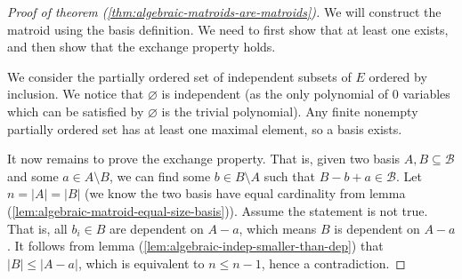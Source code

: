 \begin{proof}[Proof of theorem (\ref{thm:algebraic-matroids-are-matroids})]
    We will construct the matroid using the basis definition. We need to first show that at least one exists, and then show that the exchange property holds.

  We consider the partially ordered set of independent subsets of $E$ ordered by inclusion. We notice that $ \varnothing $ is independent (as the only polynomial of $0$ variables which can be satisfied by $\varnothing $ is the trivial polynomial). Any finite nonempty partially ordered set has at least one maximal element, so a basis exists.

  It now remains to prove the exchange property. That is, given two basis $A, B \subseteq \mathcal B$ and some $a \in A \setminus B$, we can find some $b \in B \setminus A$ such that $B - b + a \in \mathcal B$. Let $n = |A| = |B|$ (we know the two basis have equal cardinality from lemma (\ref{lem:algebraic-matroid-equal-size-basis})). Assume the statement is not true. That is, all $b _i \in B$ are dependent on $A - a$, which means $B$ is dependent on $A - a$. It follows from lemma (\ref{lem:algebraic-indep-smaller-than-dep}) that $|B| \leq |A - a|$, which is equivalent to $n \leq n - 1$, hence a contradiction.
\end{proof}

